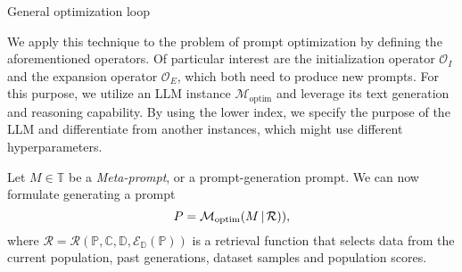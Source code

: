 \begin{algorithm}
    \caption{General optimization loop}
    \label{alg:genoptimloop}
     
         
    \end{algorithm}
    
We apply this technique to the problem of prompt optimization by defining the aforementioned operators.
Of particular interest are the initialization operator $\mathcal{O}_I$ and the expansion operator $\mathcal{O}_E$, which
both need to produce new prompts. For this purpose, we utilize an LLM instance $\mathcal{M}_{\text{optim}}$ and leverage its 
text generation and reasoning capability. By using the lower index, we specify the purpose of the LLM and differentiate 
from another instances, which might use different hyperparameters.

Let $M\in\mathbb{T}$ be a \textit{Meta-prompt}, or a prompt-generation prompt. We can now formulate generating a prompt 
\begin{equation}
    P = \mathcal{M}_{\text{optim}}(M\, \vert \, \mathcal{R})),
\end{equation}
where $\mathcal{R} = \mathcal{R}(\mathbb{P}, \mathbb{C}, \mathbb{D}, \mathcal{E}_{\mathbb{D}}(\mathbb{P}))$ is a retrieval function that selects data
from the current population, past generations, dataset samples and population scores. 

